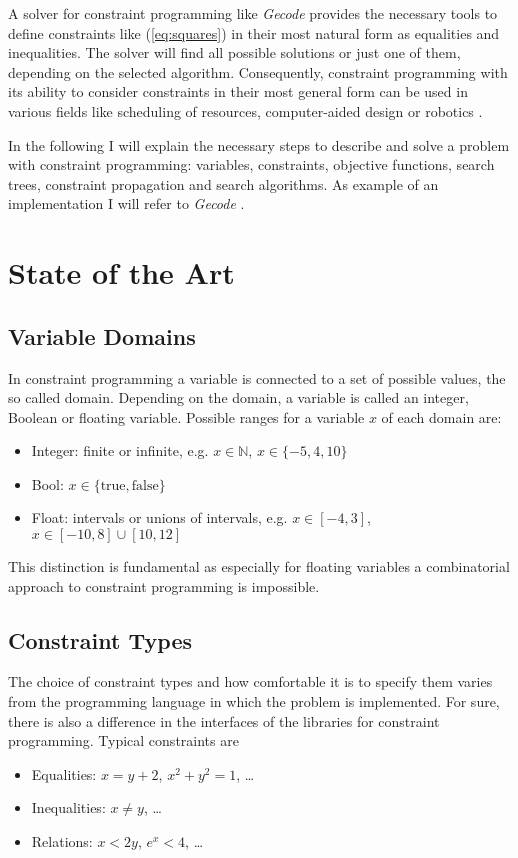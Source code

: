 \documentclass[10pt,
               a4paper,
               journal,
               ]{IEEEtran}
\newcommand{\refeq}[1]{{(\ref{#1})}}
\begin{document}
	A solver for constraint programming like \emph{Gecode} provides the necessary tools to define constraints like \refeq{eq:squares} in their most natural form as equalities and inequalities. The solver will find all possible solutions or just one of them, depending on the selected algorithm. Consequently, constraint programming with its ability to consider constraints in their most general form can be used in various fields like scheduling of resources, computer-aided design or robotics \cite[p.~221]{trendsInCP}.
	
	In the following I will explain the necessary steps to describe and solve a problem with constraint programming: variables, constraints, objective functions, search trees, constraint propagation and search algorithms. As example of an implementation I will refer to \emph{Gecode} \cite{gecode}.
	
	\section{State of the Art}
	\subsection{Variable Domains}
	In constraint programming a variable is connected to a set of possible values, the so called domain. Depending on the domain, a variable is called an integer, Boolean or floating variable. Possible ranges for a variable $x$ of each domain are:
	\begin{itemize}
		\item Integer: finite or infinite, e.g. $x \in \mathbb{N}$, $x \in \{-5, 4, 10\}$
		\item Bool: $x \in \{\text{true}, \text{false}\}$
		\item Float: intervals or unions of intervals, e.g. $x \in [-4, 3]$, $x \in [-10, 8] \cup [10, 12]$
	\end{itemize}
	This distinction is fundamental as especially for floating variables a combinatorial approach to constraint programming is impossible.
	
	\subsection{Constraint Types}
	The choice of constraint types and how comfortable it is to specify them varies from the programming language in which the problem is implemented. For sure, there is also a difference in the interfaces of the libraries for constraint programming. Typical constraints are
	\begin{itemize}
		\item Equalities: $x = y + 2$, $x^2 + y^2 = 1$, \dots
		\item Inequalities: $x \ne y$, \dots
		\item Relations: $x < 2 y$, $e^x < 4$, \dots
	\end{itemize}
	
\end{document}
